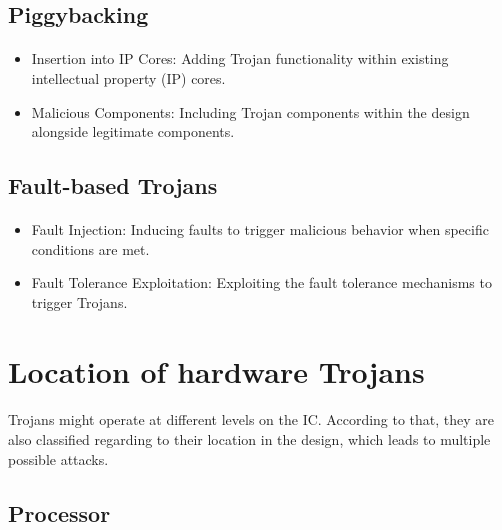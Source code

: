 \subsection{Piggybacking}
\paragraph*{}
\begin{itemize}
	\item Insertion into IP Cores: Adding Trojan functionality within existing intellectual property (IP) cores.
	\item Malicious Components: Including Trojan components within the design alongside legitimate components.
\end{itemize}
\subsection{Fault-based Trojans}
\paragraph*{}
\begin{itemize}
	\item Fault Injection: Inducing faults to trigger malicious behavior when specific conditions are met.
	\item Fault Tolerance Exploitation: Exploiting the fault tolerance mechanisms to trigger Trojans.
\end{itemize}

\section{Location of hardware Trojans }
\paragraph*{}
Trojans might operate at different levels on the IC. According to that, they are also classified regarding to their location in the design, which leads to multiple possible attacks.

\subsection{Processor}

